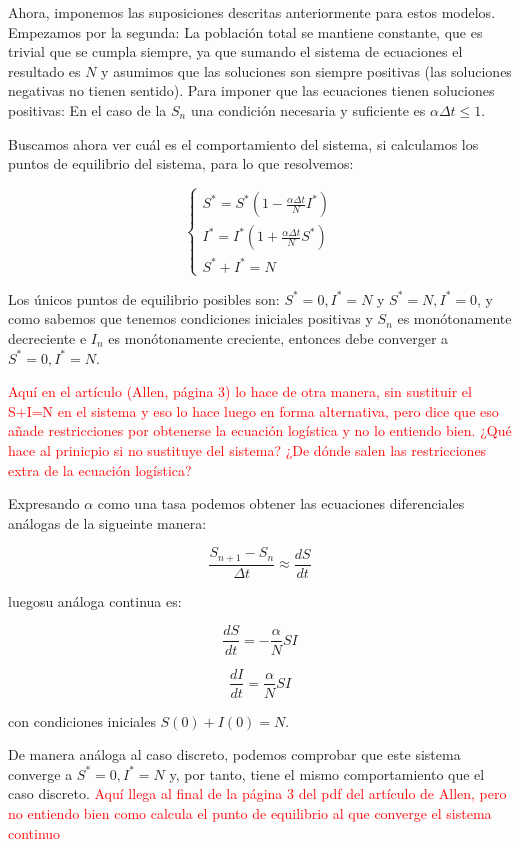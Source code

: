 Ahora, imponemos las suposiciones descritas anteriormente para estos modelos. Empezamos por la segunda: La población total se mantiene constante, que es trivial que se cumpla siempre, ya que sumando el sistema de ecuaciones el resultado es $N$ y asumimos que las soluciones son siempre positivas (las soluciones negativas no tienen sentido).
Para imponer que las ecuaciones tienen soluciones positivas:
En el caso de la $S_n$ una condición necesaria y suficiente es $\alpha\Delta t \leq 1$. 

Buscamos ahora ver cuál es el comportamiento del sistema, si calculamos los puntos de equilibrio del sistema, para lo que resolvemos:

$$
\begin{cases}
S^*=S^*\left( 1-\frac{\alpha\Delta t}{N}I^*\right) \\
I^*=I^*\left( 1+\frac{\alpha\Delta t}{N}S^*\right) \\
S^*+I^*=N
\end{cases}
$$

Los únicos puntos de equilibrio posibles son: $S^*=0, I^*=N$ y $S^*=N, I^*=0$, y como sabemos que tenemos condiciones iniciales positivas y $S_n$ es monótonamente decreciente e $I_n$ es monótonamente creciente, entonces debe converger a $S^*=0, I^*=N$.

\textcolor{red}{Aquí en el artículo (Allen, página 3) \cite{allenDiscretetimeSISIR1994} lo hace de otra manera, sin sustituir el S+I=N en el sistema y eso lo hace luego en forma alternativa, pero dice que eso añade restricciones por obtenerse la ecuación logística y no lo entiendo bien. ¿Qué hace al prinicpio si no sustituye del sistema? ¿De dónde salen las restricciones extra de la ecuación logística?}

Expresando $\alpha$ como una tasa podemos obtener las ecuaciones diferenciales análogas de la sigueinte manera:

$$\frac{S_{n+1} - S_n}{\Delta t} \approx \frac{dS}{dt}$$

luegosu análoga continua es:

\begin{equation}
\frac{dS}{dt} = -\frac{\alpha}{N}SI
\end{equation}


\begin{equation}
\frac{dI}{dt} = \frac{\alpha}{N}SI
\end{equation}

con condiciones iniciales $S(0)+I(0)=N$.

De manera análoga al caso discreto, podemos comprobar que este sistema converge a $S^*=0, I^*=N$ y, por tanto, tiene el mismo comportamiento que el caso discreto.
\textcolor{red}{Aquí llega al final de la página 3 del pdf del artículo de Allen\cite{allenDiscretetimeSISIR1994}, pero no entiendo bien como calcula el punto de equilibrio al que converge el sistema continuo}

